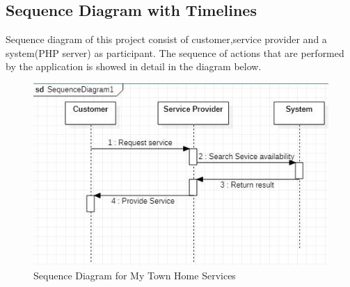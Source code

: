 \documentclass[12pt,a4paper]{report}
\begin{document}
\begin{titlepage}
{\subsection{ Sequence Diagram with Timelines}
\vspace{0.5cm}
Sequence diagram of this project consist of customer,service provider and a system(PHP server) as participant. The sequence of actions that are performed by the application is showed in detail in the diagram below.\\ 
\vspace{1.0cm}
\begin{figure}[h!]
	\begin{center}
		\includegraphics[width=\linewidth]{se.jpeg}
	\end{center}
	\caption{Sequence Diagram for My Town Home Services}
\end{figure}
\newpage
}
\end{titlepage}
\end{document}
